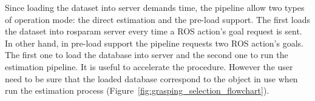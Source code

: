 Since loading the dataset into server demands time, the pipeline allow two types of operation mode: the direct estimation and the pre-load support. The first loads the dataset into rosparam server every time a ROS action's goal request is sent. In other hand, in pre-load support the pipeline requests two ROS action's goals. The first one to load the database into server and the second one to run the estimation pipeline. It is useful to accelerate the procedure. However the user need to be sure that the loaded database correspond to the object in use when run the estimation process (Figure~\ref{fig:grasping_selection_flowchart}).

\begin{figure}[h!]
\end{figure}

